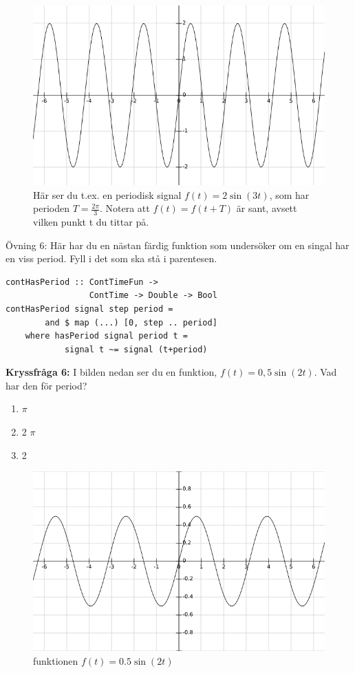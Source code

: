 \documentclass{article}
\begin{document}
\begin{figure}[ht]
\centerline{\includegraphics[scale=0.55]{image12.png}}
\caption{Här ser du t.ex. en periodisk signal $f(t)=2 \sin(3 t)$, som har perioden $T=\frac{2\pi}{3}$. Notera att $f(t)=f(t+T)$ är sant, avsett vilken punkt t du tittar på.}
\label{}
\end{figure}
\newpage
Övning 6: Här har du en nästan färdig funktion som undersöker om en singal har en viss period. Fyll i det som ska stå i parentesen. 
\begin{verbatim}
contHasPeriod :: ContTimeFun -> 
                 ContTime -> Double -> Bool
contHasPeriod signal step period = 
        and $ map (...) [0, step .. period]
    where hasPeriod signal period t = 
            signal t ~= signal (t+period)
\end{verbatim}

\textbf{Kryssfråga 6:} I bilden nedan ser du en funktion, $f(t)=0,5\sin(2t)$. Vad har den för period?
\begin{enumerate}[label={\alph*)},font={\bfseries}]
    \item $\pi$
    \item 2 $\pi$
    \item 2
\end{enumerate}

\begin{figure}[ht]
\centerline{\includegraphics[scale=0.50]{image08.png}}
\caption{funktionen $f(t) = 0.5 \sin(2t)$}
\label{}
\end{figure}
\end{document}
